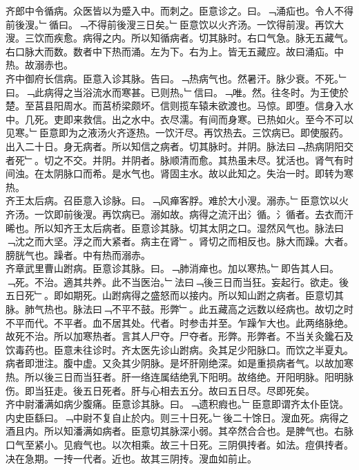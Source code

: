 \documentclass{zhvt-classic}
\begin{document}
\hspace*{2em}齐郎中令循病。众医皆以为蹙入中。而刺之。臣意诊之。曰。﹁涌疝也。令人不得前後溲。﹂循曰。﹁不得前後溲三日矣。﹂臣意饮以火齐汤。一饮得前溲。再饮大溲。三饮而疾愈。病得之内。所以知循病者。切其脉时。右口气急。脉无五藏气。右口脉大而数。数者中下热而涌。左为下。右为上。皆无五藏应。故曰涌疝。中热。故溺赤也。\\
\hspace*{2em}齐中御府长信病。臣意入诊其脉。告曰。﹁热病气也。然暑汗。脉少衰。不死。﹂曰。﹁此病得之当浴流水而寒甚。已则热。﹂信曰。﹁唯。然。往冬时。为王使於楚。至莒县阳周水。而莒桥梁颇坏。信则揽车辕未欲渡也。马惊。即堕。信身入水中。几死。吏即来救信。出之水中。衣尽濡。有间而身寒。已热如火。至今不可以见寒。﹂臣意即为之液汤火齐逐热。一饮汗尽。再饮热去。三饮病已。即使服药。出入二十日。身无病者。所以知信之病者。切其脉时。并阴。脉法曰﹁热病阴阳交者死﹂。切之不交。并阴。并阴者。脉顺清而愈。其热虽未尽。犹活也。肾气有时间浊。在太阴脉口而希。是水气也。肾固主水。故以此知之。失治一时。即转为寒热。\\
\hspace*{2em}齐王太后病。召臣意入诊脉。曰。﹁风瘅客脬。难於大小溲。溺赤。﹂臣意饮以火齐汤。一饮即前後溲。再饮病已。溺如故。病得之流汗出氵循。氵循者。去衣而汗晞也。所以知齐王太后病者。臣意诊其脉。切其太阴之口。湿然风气也。脉法曰﹁沈之而大坚。浮之而大紧者。病主在肾﹂。肾切之而相反也。脉大而躁。大者。膀胱气也。躁者。中有热而溺赤。\\
\hspace*{2em}齐章武里曹山跗病。臣意诊其脉。曰。﹁肺消瘅也。加以寒热。﹂即告其人曰。﹁死。不治。適其共养。此不当医治。﹂法曰﹁後三日而当狂。妄起行。欲走。後五日死﹂。即如期死。山跗病得之盛怒而以接内。所以知山跗之病者。臣意切其脉。肺气热也。脉法曰﹁不平不鼓。形弊﹂。此五藏高之远数以经病也。故切之时不平而代。不平者。血不居其处。代者。时参击并至。乍躁乍大也。此两络脉绝。故死不治。所以加寒热者。言其人尸夺。尸夺者。形弊。形弊者。不当关灸鑱石及饮毒药也。臣意未往诊时。齐太医先诊山跗病。灸其足少阳脉口。而饮之半夏丸。病者即泄注。腹中虚。又灸其少阴脉。是坏肝刚绝深。如是重损病者气。以故加寒热。所以後三日而当狂者。肝一络连属结绝乳下阳明。故络绝。开阳明脉。阳明脉伤。即当狂走。後五日死者。肝与心相去五分。故曰五日尽。尽即死矣。\\
\hspace*{2em}齐中尉潘满如病少腹痛。臣意诊其脉。曰。﹁遗积瘕也。﹂臣意即谓齐太仆臣饶。内史臣繇曰。﹁中尉不复自止於内。则三十日死。﹂後二十馀日。溲血死。病得之酒且内。所以知潘满如病者。臣意切其脉深小弱。其卒然合合也。是脾气也。右脉口气至紧小。见瘕气也。以次相乘。故三十日死。三阴俱抟者。如法。痘俱抟者。决在急期。一抟一代者。近也。故其三阴抟。溲血如前止。\\
\end{document}
